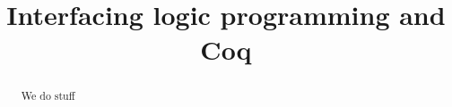 \documentclass[a4paper,USenglish,cleveref, autoref, thm-restate]{lipics-v2019}
\title{Interfacing logic programming and Coq} %
\begin{document}
\maketitle

\begin{abstract}
We do stuff
\end{abstract}









\appendix

\end{document}
